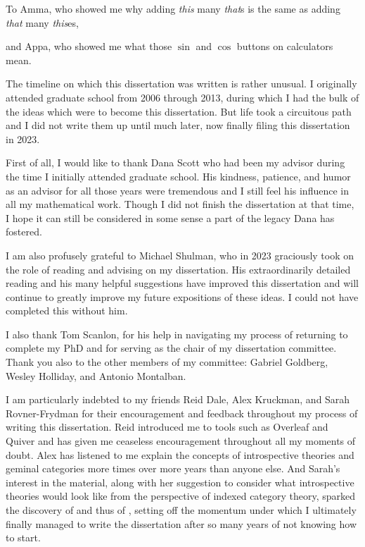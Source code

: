 \documentclass{ucbthesis}
\begin{document}
\begin{frontmatter}

\begin{dedication}
\null\vfil
\begin{center}
To Amma, who showed me why adding \textit{this} many \textit{that}s is the same as adding \textit{that} many \textit{this}es,
\\\vspace{12pt}

and Appa, who showed me what those $\sin$ and $\cos$ buttons on calculators mean.

\end{center}
\vfil\null
\end{dedication}

\begin{acknowledgements}
The timeline on which this dissertation was written is rather unusual. I originally attended graduate school from 2006 through 2013, during which I had the bulk of the ideas which were to become this dissertation. But life took a circuitous path and I did not write them up until much later, now finally filing this dissertation in 2023.

First of all, I would like to thank Dana Scott who had been my advisor during the time I initially attended graduate school. His kindness, patience, and humor as an advisor for all those years were tremendous and I still feel his influence in all my mathematical work. Though I did not finish the dissertation at that time, I hope it can still be considered in some sense a part of the legacy Dana has fostered.

I am also profusely grateful to Michael Shulman, who in 2023 graciously took on the role of reading and advising on my dissertation. His extraordinarily detailed reading and his many helpful suggestions have improved this dissertation and will continue to greatly improve my future expositions of these ideas. I could not have completed this without him.

I also thank Tom Scanlon, for his help in navigating my process of returning to complete my PhD and for serving as the chair of my dissertation committee. Thank you also to the other members of my committee: Gabriel Goldberg, Wesley Holliday, and Antonio Montalban.

I am particularly indebted to my friends Reid Dale, Alex Kruckman, and Sarah Rovner-Frydman for their encouragement and feedback throughout my process of writing this dissertation. Reid introduced me to tools such as Overleaf and Quiver and has given me ceaseless encouragement throughout all my moments of doubt. Alex has listened to me explain the concepts of introspective theories and geminal categories more times over more years than anyone else. And Sarah's interest in the material, along with her suggestion to consider what introspective theories would look like from the perspective of indexed category theory, sparked the discovery of  and thus of , setting off the momentum under which I ultimately finally managed to write the dissertation after so many years of not knowing how to start.


\end{acknowledgements}
\end{frontmatter}
\end{document}
